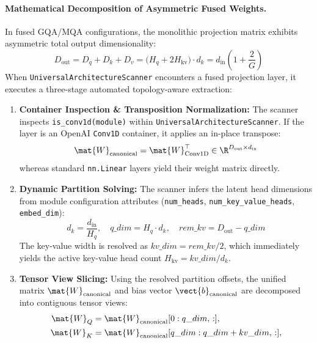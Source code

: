 \paragraph{Mathematical Decomposition of Asymmetric Fused Weights.} In fused GQA/MQA configurations, the monolithic projection matrix exhibits asymmetric total output dimensionality:
\begin{equation}
    D_{\text{out}} = D_q + D_k + D_v = \big(H_q + 2 H_{\text{kv}}\big) \cdot d_k = d_{\text{in}} \left(1 + \frac{2}{G}\right)
    \label{eq:asymmetric_fused_dim}
\end{equation}
When \texttt{UniversalArchitectureScanner} encounters a fused projection layer, it executes a three-stage automated topology-aware extraction:
\begin{enumerate}
    \item \textbf{Container Inspection \& Transposition Normalization:} The scanner inspects \texttt{is\_conv1d(module)} within \texttt{UniversalArchitectureScanner}. If the layer is an OpenAI \texttt{Conv1D} container, it applies an in-place transpose:
    \begin{equation}
        \mat{W}_{\text{canonical}} = \mat{W}_{\text{Conv1D}}^\top \in \R^{D_{\text{out}} \times d_{\text{in}}}
        \label{eq:conv1d_transposition}
    \end{equation}
    whereas standard \texttt{nn.Linear} layers yield their weight matrix directly.
    \item \textbf{Dynamic Partition Solving:} The scanner infers the latent head dimensions from module configuration attributes (\texttt{num\_heads}, \texttt{num\_key\_value\_heads}, \texttt{embed\_dim}):
    \begin{equation}
        d_k = \frac{d_{\text{in}}}{H_q}, \quad q\_dim = H_q \cdot d_k, \quad rem\_kv = D_{\text{out}} - q\_dim
    \end{equation}
    The key-value width is resolved as $kv\_dim = rem\_kv / 2$, which immediately yields the active key-value head count $H_{\text{kv}} = kv\_dim / d_k$.
    \item \textbf{Tensor View Slicing:} Using the resolved partition offsets, the unified matrix $\mat{W}_{\text{canonical}}$ and bias vector $\vect{b}_{\text{canonical}}$ are decomposed into contiguous tensor views:
    \begin{align}
        \mat{W}_Q &= \mat{W}_{\text{canonical}}[0 : q\_dim, \, :], \nonumber \\
        \mat{W}_K &= \mat{W}_{\text{canonical}}[q\_dim : q\_dim + kv\_dim, \, :], \nonumber \\

\end{align}
\end{enumerate}
